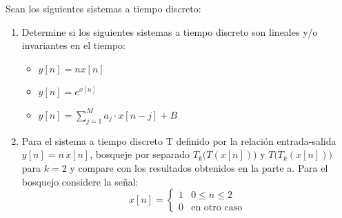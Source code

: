 \documentclass[
  11pt,
  letterpaper,
   addpoints,
  ]{exam}
\begin{document}
\begin{questions}
\question Sean los siguientes sistemas a tiempo discreto:

\begin{enumerate}
\item Determine si los siguientes sistemas a tiempo discreto son lineales y/o invariantes en el tiempo:
\begin{itemize}
\item $y[n] = nx[n]$
\item $y[n] = e^{x[n]}$
\item $y[n] = \sum_{j=1}^{M} a_j \cdot x[n-j] + B$
\end{itemize}

\item Para el sistema a tiempo discreto T definido por la relación entrada-salida $y[n] = n\,x[n]$, bosqueje por separado $T_k\big(T(x[n])\big)$ y $T\big(T_k(x[n])\big)$ para $k = 2$ y compare con los resultados obtenidos en la parte a. Para el bosquejo considere la señal:
\begin{equation}
x[n] = \begin{cases}
1 & 0 \leq n \leq 2 \\
0 & \text{en otro caso}
\end{cases}
\end{equation}
\end{enumerate}
\begin{solution}

\end{solution}
\end{questions}
\end{document}

